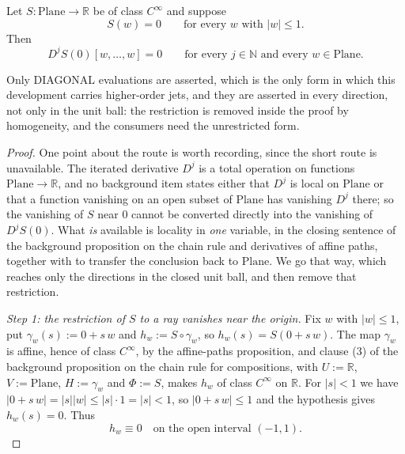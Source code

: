 \begin{lemma}
Let $S\colon\mathrm{Plane}\to\mathbb{R}$ be of class $C^{\infty}$ and suppose
\[
  S(w)=0\qquad\text{for every }w\text{ with }\lvert w\rvert\le1 .
\]
Then
\[
  D^{j}S(0)[w,\ldots,w]=0\qquad\text{for every }j\in\mathbb{N}
  \text{ and every }w\in\mathrm{Plane}.
\]

Only DIAGONAL evaluations are asserted, which is the only form in which this development carries
higher-order jets, and they are asserted in every direction, not only in the unit ball: the
restriction is removed inside the proof by homogeneity, and the consumers need the unrestricted
form.
\end{lemma}
\begin{proof}
One point about the route is worth recording, since the short route is unavailable.  The iterated
derivative $D^{j}$ is a total operation on functions $\mathrm{Plane}\to\mathbb{R}$, and no
background item states either that $D^{j}$ is local on $\mathrm{Plane}$ or that a function
vanishing on an open subset of $\mathrm{Plane}$ has vanishing $D^{j}$ there; so the vanishing of
$S$ near $0$ cannot be converted directly into the vanishing of $D^{j}S(0)$.  What \emph{is}
available is locality in \emph{one} variable, in the closing sentence of the background
proposition on the chain rule and derivatives of affine paths, together with
 to transfer the conclusion back to $\mathrm{Plane}$.  We go that
way, which reaches only the directions in the closed unit ball, and then remove that restriction.

\medskip\noindent\emph{Step 1: the restriction of $S$ to a ray vanishes near the origin.}
Fix $w$ with $\lvert w\rvert\le1$, put $\gamma_w(s):=0+s\,w$ and $h_w:=S\circ\gamma_w$, so
$h_w(s)=S(0+s\,w)$.  The map $\gamma_w$ is affine, hence of class $C^{\infty}$, by the
affine-paths proposition, and clause (3) of the background proposition on the chain rule for
compositions, with $U:=\mathbb{R}$, $V:=\mathrm{Plane}$, $H:=\gamma_w$ and $\Phi:=S$, makes
$h_w$ of class $C^{\infty}$ on $\mathbb{R}$.  For $\lvert s\rvert<1$ we have
$\lvert 0+s\,w\rvert=\lvert s\rvert\lvert w\rvert\le\lvert s\rvert\cdot1=\lvert s\rvert<1$, so
$\lvert 0+s\,w\rvert\le1$ and the hypothesis gives $h_w(s)=0$.  Thus
\begin{equation}\label{eq:vbk-hzero}
  h_w\equiv0\quad\text{on the open interval }(-1,1).
\end{equation}


\end{proof}
